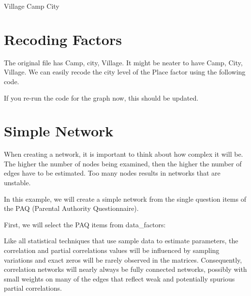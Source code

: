 \documentclass[]{book}
\newenvironment{Shaded}{\begin{snugshade}}{\end{snugshade}}
\newcommand{\DataTypeTok}[1]{\textcolor[rgb]{0.13,0.29,0.53}{#1}}
\newcommand{\KeywordTok}[1]{\textcolor[rgb]{0.13,0.29,0.53}{\textbf{#1}}}
\newcommand{\NormalTok}[1]{#1}
\newcommand{\OperatorTok}[1]{\textcolor[rgb]{0.81,0.36,0.00}{\textbf{#1}}}
\newcommand{\StringTok}[1]{\textcolor[rgb]{0.31,0.60,0.02}{#1}}
\begin{document}
 Village Camp City

\hypertarget{recoding-factors}{%
\section{Recoding Factors}\label{recoding-factors}}

The original file has Camp, city, Village. It might be neater to have Camp, City, Village. We can easily recode the city level of the Place factor using the following code.

If you re-run the code for the graph now, this should be updated.

\begin{Shaded}
\end{Shaded}

\hypertarget{simple-network}{%
\section{Simple Network}\label{simple-network}}

When creating a network, it is important to think about how complex it will be. The higher the number of nodes being examined, then the higher the number of edges have to be estimated. Too many nodes results in networks that are unstable.

In this example, we will create a simple network from the single question items of the PAQ (Parental Authority Questionnaire).

First, we will select the PAQ items from data\_factors:

\begin{Shaded}
\end{Shaded}

Like all statistical techniques that use sample data to estimate parameters, the correlation and partial correlations values will be influenced by sampling variations and exact zeros will be rarely observed in the matrices. Consequently, correlation networks will nearly always be fully connected networks, possibly with small weights on many of the edges that reflect weak and potentially spurious partial correlations.
\end{document}
